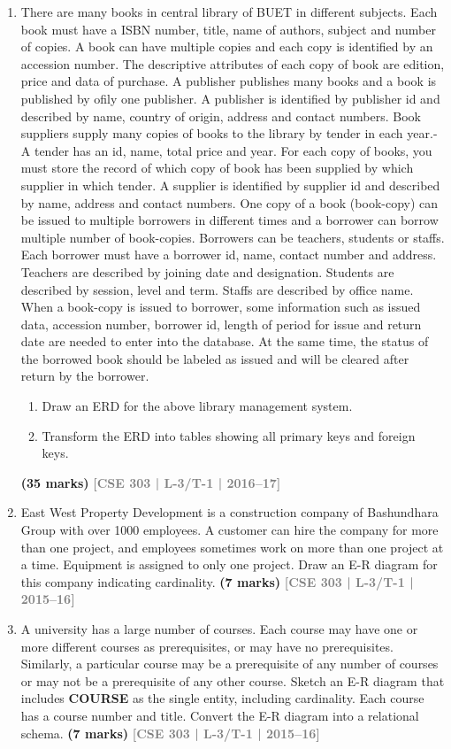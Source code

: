 \documentclass[12pt]{article}
\newcommand{\yr}[1]{\hfill\textcolor{gray}{\small\textbf{[#1]}}}
\newcommand{\mk}[1]{\textcolor{orange!70!black}{\small\textbf{(#1 marks)}}}
\begin{document}
\begin{enumerate}
\item 
There are many books in central library of BUET in different subjects. Each book must
have a ISBN number, title, name of authors, subject and number of copies. A book can
have multiple copies and each copy is identified by an accession number. The
descriptive attributes of each copy of book are edition, price and data of purchase. A
publisher publishes many books and a book is published by ofily one publisher. A
publisher is identified by publisher id and described by name, country of origin,
address and contact numbers.
Book suppliers supply many copies of books to the library by tender in each year.- A
tender has an id, name, total price and year. For each copy of books, you must store the
record of which copy of book has been supplied by which supplier in which tender. A
supplier is identified by supplier id and described by name, address and contact
numbers.
One copy of a book (book-copy) can be issued to multiple borrowers in different times
and a borrower can borrow multiple number of book-copies. Borrowers can be
teachers, students or staffs. Each borrower must have a borrower id, name, contact
number and address. Teachers are described by joining date and designation. Students
are described by session, level and term. Staffs are described by office name.
When a book-copy is issued to borrower, some information such as issued data,
accession number, borrower id, length of period for issue and return date are needed to
enter into the database. At the same time, the status of the borrowed book should be
labeled as issued and will be cleared after return by the borrower.
\begin{enumerate}
  \item Draw an ERD for the above library management system.
  \item Transform the ERD into tables showing all primary keys and foreign keys.
\end{enumerate}
\mk{35} \yr{CSE 303 | L-3/T-1 | 2016--17}


\item East West Property Development is a construction company of Bashundhara Group with over 1000 employees. A customer can hire the company for more than one project, and employees sometimes work on more than one project at a time. Equipment is assigned to only one project. Draw an E-R diagram for this company indicating cardinality.
\mk{7} \yr{CSE 303 | L-3/T-1 | 2015--16}


\item A university has a large number of courses. Each course may have one or more different courses as prerequisites, or may have no prerequisites. Similarly, a particular course may be a prerequisite of any number of courses or may not be a prerequisite of any other course. Sketch an E-R diagram that includes \textbf{COURSE} as the single entity, including cardinality. Each course has a course number and title. Convert the E-R diagram into a relational schema.
\mk{7} \yr{CSE 303 | L-3/T-1 | 2015--16}



\end{enumerate}
\end{document}
